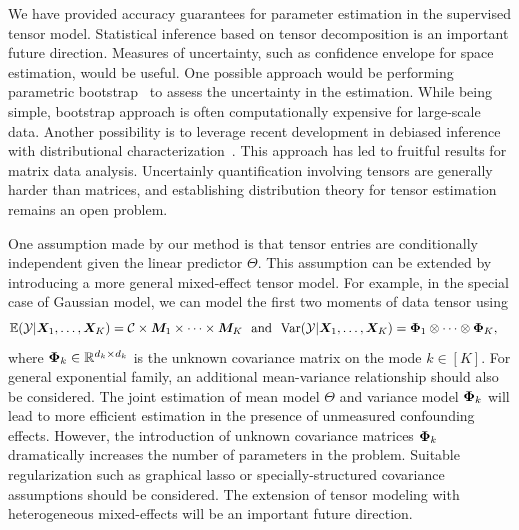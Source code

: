 \documentclass[12pt]{article}
\theoremstyle{definition}
\theoremstyle{definition}
\begin{document}
We have provided accuracy guarantees for parameter estimation in the supervised tensor model. Statistical inference based on tensor decomposition is an important future direction. Measures of uncertainty, such as confidence envelope for space estimation, would be useful. One possible approach would be performing parametric bootstrap~\citep{tibshirani1993introduction} to assess the uncertainty in the estimation. 
While being simple, bootstrap approach is often computationally expensive for large-scale data. Another possibility is to leverage recent development in debiased inference with distributional characterization~\citep{chen2019inference,xia2019confidence}. This approach has led to fruitful results for matrix data analysis. Uncertainly quantification involving tensors are generally harder than matrices, and establishing distribution theory for tensor estimation remains an open problem.

One assumption made by our method is that tensor entries are conditionally independent given the linear predictor $\Theta$. This assumption can be extended by introducing a more general mixed-effect tensor model. For example, in the special case of Gaussian model, we can model the first two moments of data tensor using
\begin{align}\label{eq:extention}
\mathbb{E}(\tY|\mX_1,\ldots,\mX_K)&=\tC\times\mM_1\times \cdots \times \mM_K\ \ \text{and}\ \ \text{Var}(\tY|\mX_1,\ldots,\mX_K)=\mPhi_1\otimes \cdots \otimes \mPhi_K,
\end{align}
where $\bm{\Phi}_k\in\mathbb{R}^{d_k\times d_k}$ is the unknown covariance matrix on the mode $k\in[K]$. For general exponential family, an additional mean-variance relationship should also be considered. The joint estimation of mean model $\Theta$ and variance model $\bm{\Phi}_k$ will lead to more efficient estimation in the presence of unmeasured confounding effects. However, the introduction of unknown covariance matrices $\bm{\Phi}_k$ dramatically increases the number of parameters in the problem. Suitable regularization such as graphical lasso or specially-structured covariance assumptions should be considered. The extension of tensor modeling with heterogeneous mixed-effects will be an important future direction. 
\end{document}
